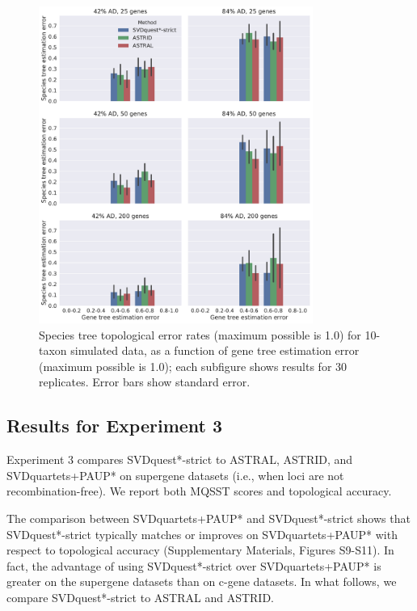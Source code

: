 \begin{figure}
  \centering
  \includegraphics[width=0.8\textwidth]{svdquest-figs/coalescent_rfdists_10tax.pdf}
\caption[Species tree topological error rates for 10-taxon simulated data]{Species tree topological error rates (maximum possible is 1.0) for 10-taxon simulated data, as a
    function of gene tree estimation error (maximum possible is 1.0); each subfigure shows results for 30 replicates. Error bars show standard
    error. 
}
    \label{svdquest::fig:exp2_10}
\end{figure}


\clearpage
\subsection{Results for Experiment 3}

Experiment 3 compares SVDquest*-strict to  ASTRAL, ASTRID, and SVDquartets+PAUP* on supergene datasets (i.e.,  when loci are not
recombination-free). 
We report both MQSST scores and topological accuracy.


The comparison between SVDquartets+PAUP* and SVDquest*-strict shows that
SVDquest*-strict typically matches or improves on SVDquartets+PAUP* with respect to
topological accuracy  {(Supplementary Materials, Figures S9-S11)}. 
In fact, the advantage of using SVDquest*-strict over SVDquartets+PAUP* is greater
on the supergene datasets than on c-gene datasets.
In what follows, we compare SVDquest*-strict to ASTRAL and ASTRID.


